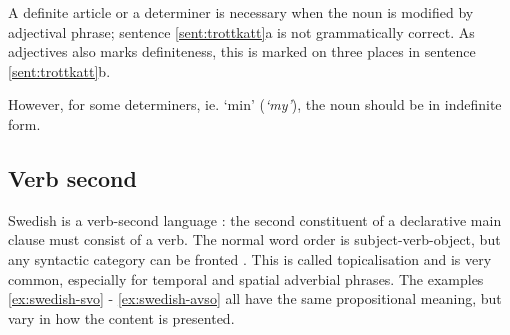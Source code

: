 \documentclass{report}
\begin{document}
A definite article or a determiner is necessary when the noun is modified by adjectival
phrase; sentence \ref{sent:trottkatt}a is not grammatically correct.
As adjectives also marks definiteness, this is marked on three places
in sentence \ref{sent:trottkatt}b. %

\label{sent:trottkatt}
However, for some determiners, ie. `min' (\emph{`my'}), the noun should be in indefinite form.

\enumsentence{\longexnt{3}{3}
{Min &trötta& katt.} %
{`My & tired & cat'}
{ $[${\sc+def}$]$ &$[${\sc+def}$]$& $[${\sc-def}$]$} %
{}}



\subsection*{Verb second}
Swedish is a verb-second language \cite[p.116]{gunlog}: the
second constituent of a declarative main clause must consist of a verb.
The normal word order is subject-verb-object, but any syntactic category can be
fronted \cite[]{H&H}.
This is called topicalisation and is very common, especially for temporal and spatial adverbial phrases.
The examples \ref{ex:swedish-svo} - \ref{ex:swedish-avso} all have the same propositional
meaning, but vary in how the content is presented.
 \label{ex:swedish-svo}
\vspace{-3mm}
\label{ex:swedish-ovs} 
\vspace{-3mm}
 \label{ex:swedish-avso}
\end{document}
